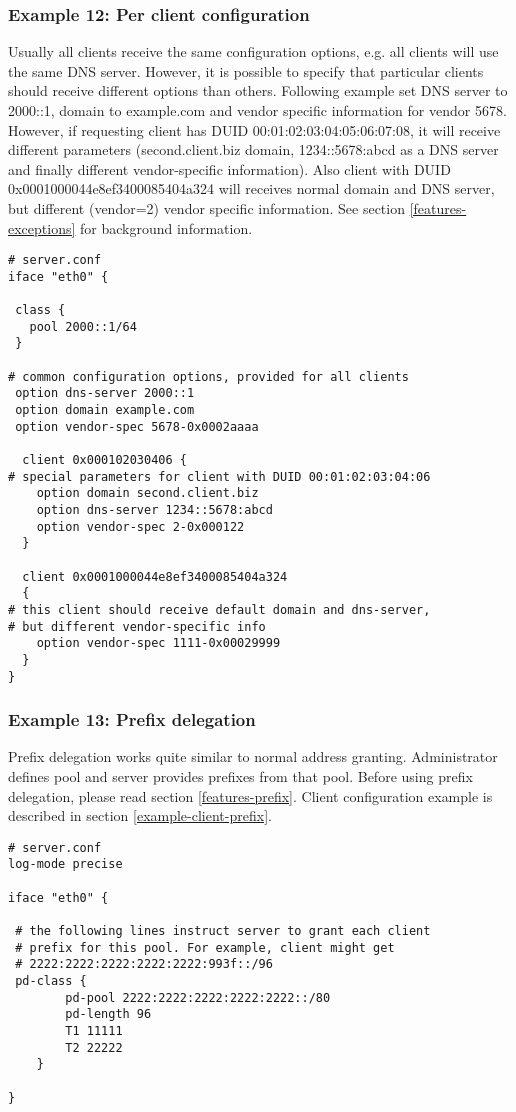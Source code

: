 \subsubsection{Example 12: Per client configuration}
\label{example-server-exceptions}
Usually all clients receive the same configuration options, e.g. all
clients will use the same DNS server. However, it is possible to
specify that particular clients should receive different options than
others. Following example set DNS server to 2000::1, domain
to example.com and vendor specific information for vendor 5678.
However, if requesting client has DUID 00:01:02:03:04:05:06:07:08, it
will receive different parameters (second.client.biz domain,
1234::5678:abcd as a DNS server and finally different vendor-specific
information). Also client with DUID 0x0001000044e8ef3400085404a324
will receives normal domain and DNS server, but different (vendor=2)
vendor specific information. See section \ref{features-exceptions} for
background information.

\begin{lstlisting}
# server.conf
iface "eth0" {

 class {
   pool 2000::1/64
 }

# common configuration options, provided for all clients
 option dns-server 2000::1
 option domain example.com
 option vendor-spec 5678-0x0002aaaa
 
  client 0x000102030406 {
# special parameters for client with DUID 00:01:02:03:04:06      
	option domain second.client.biz
	option dns-server 1234::5678:abcd
	option vendor-spec 2-0x000122
  }

  client 0x0001000044e8ef3400085404a324
  {
# this client should receive default domain and dns-server, 
# but different vendor-specific info
	option vendor-spec 1111-0x00029999
  }
}
\end{lstlisting}

\subsubsection{Example 13: Prefix delegation}
\label{example-server-prefix}

Prefix delegation works quite similar to normal address granting.
Administrator defines pool and server provides prefixes from that
pool. Before using prefix delegation, please read section
\ref{features-prefix}. Client configuration example is described in section 
\ref{example-client-prefix}.

\begin{lstlisting}
# server.conf
log-mode precise

iface "eth0" {
 
 # the following lines instruct server to grant each client
 # prefix for this pool. For example, client might get
 # 2222:2222:2222:2222:2222:993f::/96
 pd-class {
        pd-pool 2222:2222:2222:2222:2222::/80
        pd-length 96
        T1 11111
        T2 22222
    }
 
}
\end{lstlisting}

